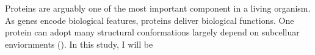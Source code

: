 Proteins are arguably one of the most important component in a living organism. As genes encode biological features, proteins deliver biological functions. One protein can adopt many structural conformations largely depend on subcelluar enviornments ().    In this study, I will be 